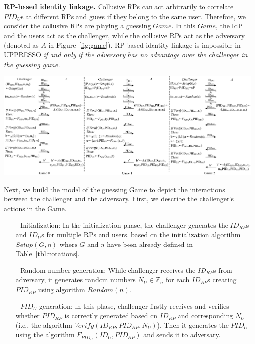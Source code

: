 \vspace{-2mm}
\noindent\textbf{RP-based identity linkage.}
Collusive RPs can act arbitrarily to correlate $PID_U$s at different RPs and guess if they belong to the same user. Therefore, we consider the collusive RPs are playing a guessing $Game$. In this $Game$, the IdP and the users act as the challenger, while the collusive RPs act as the adversary (denoted as $A$ in Figure~\ref{fig:game}). RP-based identity linkage is impossible in UPPRESSO {\em if and only if the adversary has no advantage over the challenger in the guessing game.}

\vspace{1mm}
\begin{strip}
\centering\includegraphics[width=\textwidth, height=0.35\textheight]{fig/game.pdf}
\label{fig:game}
\vspace{-5mm}
\end{strip}

Next, we build the model of the guessing Game to depict the interactions between the challenger and the adversary. First, we describe the challenger's actions in the Game.

\begin{itemize}
\vspace{-\topsep}
\item[-] Initialization: In the initialization phase, the challenger generates the $ID_{RP}$s and $ID_U$s for multiple RPs and users, based on the initialization algorithm $Setup(G,n)$ where $G$ and $n$ have been already defined in Table~\ref{tbl:notations}.
\vspace{-\topsep}
\item[-] Random number generation: While challenger receives the $ID_{RP}$s from adversary, it generates random numbers $N_U \in \mathbb{Z}_n$ for each $ID_{RP}$s creating $PID_{RP}$ using algorithm $Random(n)$.
\vspace{-\topsep}
\item[-] $PID_U$ generation: In this phase, challenger firstly receives and  verifies whether $PID_{RP}$ is correctly generated based on $ID_{RP}$ and corresponding $N_U$ (i.e., the algorithm $Verify(ID_{RP},PID_{RP},N_U)$). Then it generates the $PID_U$ using the algorithm $F_{PID_U}(ID_U,PID_{RP})$ and sends it to adversary.
\end{itemize}



